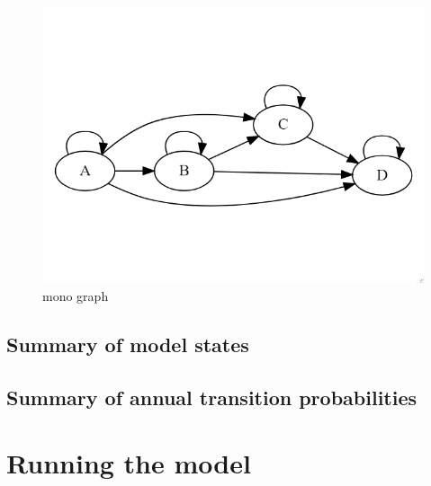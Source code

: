 \documentclass[
]{article}
\newenvironment{Shaded}{\begin{snugshade}}{\end{snugshade}}
\newcommand{\CommentTok}[1]{\textcolor[rgb]{0.56,0.35,0.01}{\textit{#1}}}
\begin{document}
\begin{figure}
\centering
\includegraphics{"mono.png"}
\caption{mono graph}
\end{figure}

\hypertarget{summary-of-model-states}{%
\subsection{Summary of model states}\label{summary-of-model-states}}

\begin{Shaded}
\end{Shaded}

\hypertarget{summary-of-annual-transition-probabilities}{%
\subsection{Summary of annual transition
probabilities}\label{summary-of-annual-transition-probabilities}}

\begin{Shaded}
\end{Shaded}

\hypertarget{running-the-model}{%
\section{Running the model}\label{running-the-model}}
\end{document}
